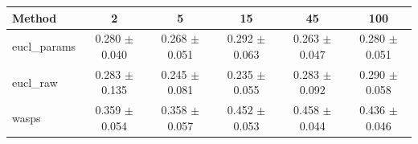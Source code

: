 \begin{table}[htbp]
\centering
\begin{NiceTabular}{lccccc}
\toprule
Method & 2 & 5 & 15 & 45 & 100 \\
\midrule
eucl\_params & 0.280 $\pm$ 0.040 & 0.268 $\pm$ 0.051 & 0.292 $\pm$ 0.063 & 0.263 $\pm$ 0.047 & 0.280 $\pm$ 0.051 \\
eucl\_raw & 0.283 $\pm$ 0.135 & 0.245 $\pm$ 0.081 & 0.235 $\pm$ 0.055 & 0.283 $\pm$ 0.092 & 0.290 $\pm$ 0.058 \\
wasps & 0.359 $\pm$ 0.054 & 0.358 $\pm$ 0.057 & 0.452 $\pm$ 0.053 & 0.458 $\pm$ 0.044 & 0.436 $\pm$ 0.046 \\
\bottomrule
\end{NiceTabular}
\label{tab:sens_river_n_train_barycenter}
\end{table}
